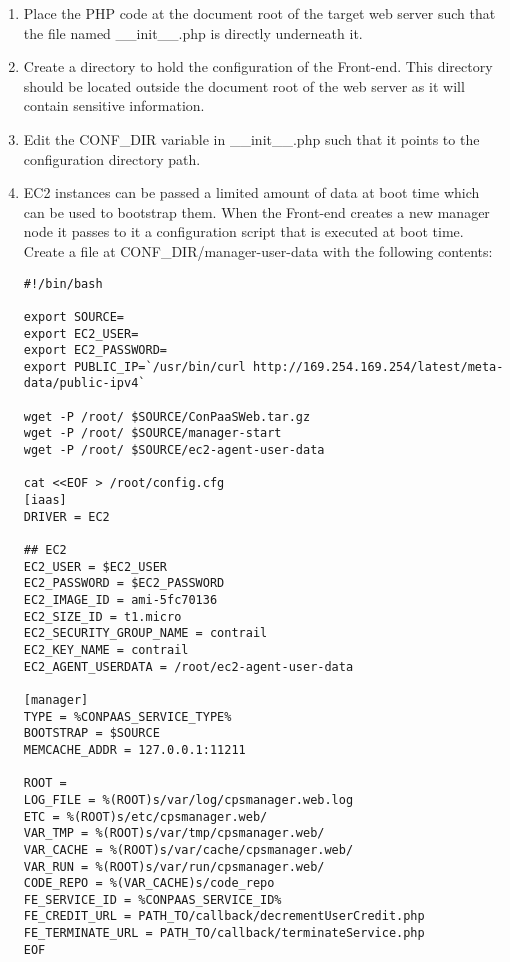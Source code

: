 \documentclass[12pt]{article}
\newenvironment{framedbox}[1]%
{\begin{framed}
 \begingroup
 \fontsize{#1}{#1}\selectfont
}
{
 \endgroup
 \end{framed}
}
\begin{document}
\begin{enumerate}
\item Place the PHP code at the document root of the target web server such
      that the file named \_\_init\_\_.php is directly underneath it.
\item Create a directory to hold the configuration of the Front-end. This
      directory should be located outside the document root of the web server
      as it will contain sensitive information.
\item Edit the CONF\_DIR variable in \_\_init\_\_.php such that it points to the
      configuration directory path.

\item EC2 instances can be passed a limited amount of data at boot time which
can be used to bootstrap them. When the Front-end creates a new manager node it
passes to it a configuration script that is executed at boot time.
Create a file at CONF\_DIR/manager-user-data with the following contents:
\begin{framedbox}{8pt}\begin{verbatim}
#!/bin/bash

export SOURCE=
export EC2_USER=
export EC2_PASSWORD=
export PUBLIC_IP=`/usr/bin/curl http://169.254.169.254/latest/meta-data/public-ipv4`

wget -P /root/ $SOURCE/ConPaaSWeb.tar.gz
wget -P /root/ $SOURCE/manager-start
wget -P /root/ $SOURCE/ec2-agent-user-data

cat <<EOF > /root/config.cfg
[iaas]
DRIVER = EC2

## EC2
EC2_USER = $EC2_USER
EC2_PASSWORD = $EC2_PASSWORD
EC2_IMAGE_ID = ami-5fc70136
EC2_SIZE_ID = t1.micro
EC2_SECURITY_GROUP_NAME = contrail
EC2_KEY_NAME = contrail
EC2_AGENT_USERDATA = /root/ec2-agent-user-data

[manager]
TYPE = %CONPAAS_SERVICE_TYPE%
BOOTSTRAP = $SOURCE
MEMCACHE_ADDR = 127.0.0.1:11211

ROOT = 
LOG_FILE = %(ROOT)s/var/log/cpsmanager.web.log
ETC = %(ROOT)s/etc/cpsmanager.web/
VAR_TMP = %(ROOT)s/var/tmp/cpsmanager.web/
VAR_CACHE = %(ROOT)s/var/cache/cpsmanager.web/
VAR_RUN = %(ROOT)s/var/run/cpsmanager.web/
CODE_REPO = %(VAR_CACHE)s/code_repo
FE_SERVICE_ID = %CONPAAS_SERVICE_ID%
FE_CREDIT_URL = PATH_TO/callback/decrementUserCredit.php
FE_TERMINATE_URL = PATH_TO/callback/terminateService.php
EOF


\end{verbatim}
\end{framedbox}
\end{enumerate}
\end{document}
